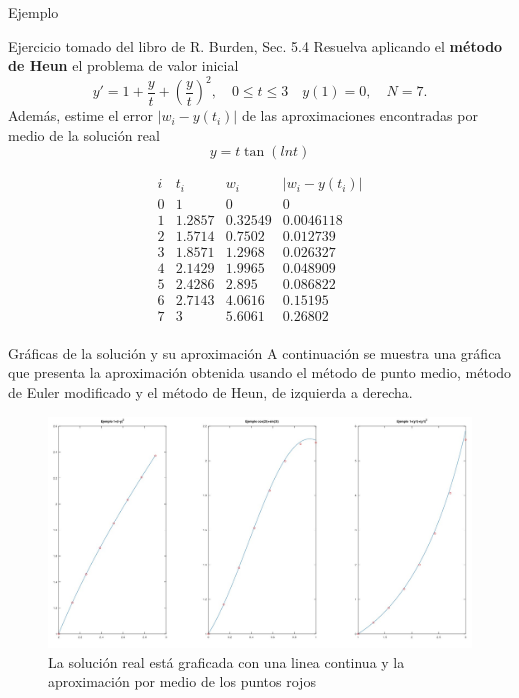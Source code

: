 \begin{frame}{Ejemplo}
\begin{block}{Ejercicio tomado del libro de R. Burden, Sec. 5.4}
Resuelva aplicando el \textbf{método de Heun} el problema de valor inicial
$$y'=1+\frac{y}{t}+(\frac{y}{t})^2, \quad 0\leq t\leq 3 \quad y(1)=0, \quad N=7.$$
Además, estime el error $|w_i-y(t_i)|$ de las aproximaciones encontradas por medio de la solución real 
$$y=t\tan(lnt)$$
\end{block}
\begin{displaymath}
\begin{array}{r|lll}
i& t_i& w_i & |w_i-y(t_i)|\\
\hline\hline
0&1&0   &       0\\
1&1.2857&0.32549        &       0.0046118\\
2&1.5714&0.7502 &       0.012739\\
3&1.8571&1.2968 &       0.026327\\
4&2.1429&1.9965 &       0.048909\\
5&2.4286&2.895  &       0.086822\\
6&2.7143&4.0616 &       0.15195\\
7&3&5.6061      &       0.26802\\
\end{array}
\end{displaymath}
\end{frame}

\begin{frame}{Gráficas de la solución y su aproximación}
A continuación se muestra una gráfica que presenta la aproximación obtenida usando el método de punto medio, método de Euler modificado y el método de Heun, de izquierda a derecha.
\begin{figure}
\includegraphics[scale=0.4]{TerceraUnidad/GraficaApro_RungeKutta}
\caption{La solución real está graficada con una linea continua y la aproximación por medio de los puntos rojos}
\end{figure}
\end{frame}

